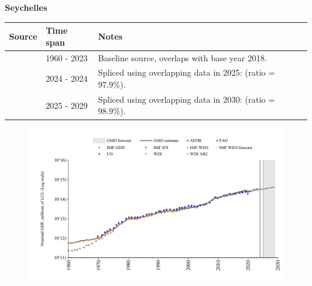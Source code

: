 \documentclass[12pt,a4paper,landscape]{article}
\begin{document}
\begin{adjustbox}{max totalsize={\paperwidth}{\paperheight},center}
\begin{minipage}[t][\textheight][t]{\textwidth}
\vspace*{0.5cm}
{}
\begin{center}
{\Large\bfseries Seychelles}
\end{center}
\vspace{0.5cm}
\begin{table}[H]
\centering
\small
\begin{tabular}{|l|l|l|}
\hline
\textbf{Source} & \textbf{Time span} & \textbf{Notes} \\
\hline
\rowcolor{white}\cite{WDI}& 1960 - 2023 &Baseline source, overlaps with base year 2018.\\
\rowcolor{lightgray}\cite{IMF_IFS}& 2024 - 2024 &Spliced using overlapping data in 2025: (ratio = 97.9\%).\\
\rowcolor{white}\cite{IMF_WEO_forecast}& 2025 - 2029 &Spliced using overlapping data in 2030: (ratio = 98.9\%).\\
\hline
\end{tabular}
\end{table}
\begin{figure}[H]
\centering
\includegraphics[width=\textwidth,height=0.6\textheight,keepaspectratio]{graphs/SYC_nGDP.pdf}
\end{figure}
\end{minipage}
\end{adjustbox}
\end{document}
